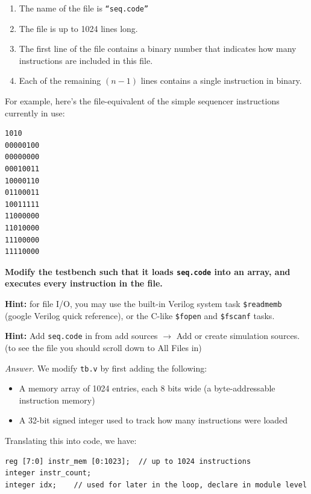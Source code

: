 \documentclass[10pt,letterpaper]{article}
\begin{document}
\begin{enumerate}
    \item The name of the file is \texttt{``seq.code''}
    \item The file is up to 1024 lines long.
    \item The first line of the file contains a binary number that indicates how many instructions are included in this file.
    \item Each of the remaining $(n-1)$ lines contains a single instruction in binary.
\end{enumerate}

For example, here’s the file-equivalent of the simple sequencer instructions currently in use:\\

\begin{mdframed}
\begin{verbatim}
1010
00000100
00000000
00010011
10000110
01100011
10011111
11000000
11010000
11100000
11110000
\end{verbatim}
\end{mdframed}



\textbf{Modify the testbench such that it loads \texttt{seq.code} into an array, and executes every instruction in the file.}

\textbf{Hint:} for file I/O, you may use the built-in Verilog system task \texttt{\$readmemb} (google Verilog quick reference), or the C-like \texttt{\$fopen} and \texttt{\$fscanf} tasks.

\textbf{Hint:} Add \texttt{seq.code} in from add sources $\rightarrow$ Add or create simulation sources. (to see the file you should scroll down to All Files in)

\textit{Answer.} We modify \verb|tb.v| by first adding the following:
\begin{itemize}
    \item A memory array of 1024 entries, each 8 bits wide (a byte-addressable instruction memory)
    \item A 32-bit signed integer used to track how many instructions were loaded
\end{itemize}

Translating this into code, we have:\\

\begin{mdframed}
\begin{verbatim}
reg [7:0] instr_mem [0:1023];  // up to 1024 instructions
integer instr_count;
integer idx;    // used for later in the loop, declare in module level
\end{verbatim}
\end{mdframed}
\end{document}
